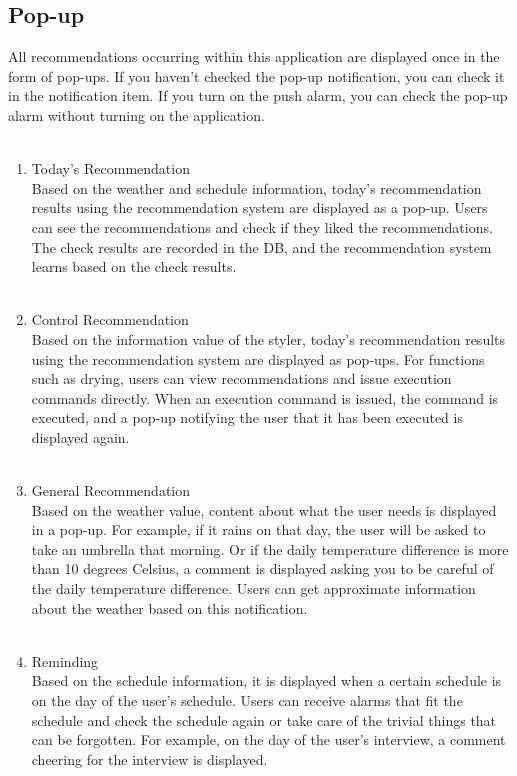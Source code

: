 \documentclass[conference]{IEEEtran}
\begin{document}
\subsection{Pop-up}
All recommendations occurring within this application are displayed once in the form of pop-ups. If you haven't checked the pop-up notification, you can check it in the notification item. If you turn on the push alarm, you can check the pop-up alarm without turning on the application. \\ \\
\begin{enumerate}
    \item Today's Recommendation\\
        Based on the weather and schedule information, today's recommendation results using the recommendation system are displayed as a pop-up. Users can see the recommendations and check if they liked the recommendations. The check results are recorded in the DB, and the recommendation system learns based on the check results. \\ \\
    \item Control Recommendation\\
        Based on the information value of the styler, today's recommendation results using the recommendation system are displayed as pop-ups. For functions such as drying, users can view recommendations and issue execution commands directly. When an execution command is issued, the command is executed, and a pop-up notifying the user that it has been executed is displayed again. \\ \\
    \item General Recommendation\\
        Based on the weather value, content about what the user needs is displayed in a pop-up. For example, if it rains on that day, the user will be asked to take an umbrella that morning. Or if the daily temperature difference is more than 10 degrees Celsius, a comment is displayed asking you to be careful of the daily temperature difference. Users can get approximate information about the weather based on this notification. \\ \\
    \item Reminding\\
        Based on the schedule information, it is displayed when a certain schedule is on the day of the user's schedule. Users can receive alarms that fit the schedule and check the schedule again or take care of the trivial things that can be forgotten. For example, on the day of the user's interview, a comment cheering for the interview is displayed. \\ \\
        

\end{enumerate}
\end{document}
